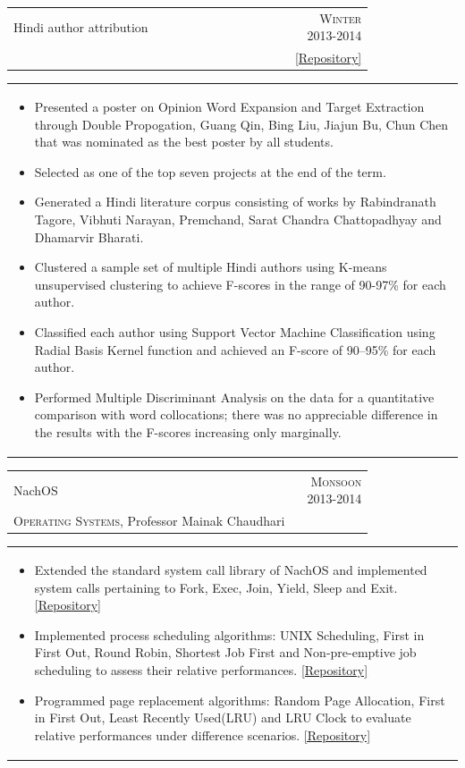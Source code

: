 \documentclass[a4paper,10pt]{article} %
\newcommand{\cproject}[5]{
    \begin{tabular}{p{0.80\linewidth}r}
        \textcolor{NavyBlue}{#2} & \multicolumn{1}{m{4cm}}{\raggedleft \textsc{#1}}\\
        #3 & #4
    \end{tabular}
    \begin{tabular}{p{\linewidth}}
    \vspace{-0.3cm}
        \footnotesize{#5}
    \end{tabular}
    \vspace{-0.5cm}
}
\begin{document}
\cproject
    {Winter 2013-2014}
    {Hindi author attribution}
    {\textsc{\raggedright Artificial Intelligence}, Professor Amitabha Mukherjee}
    { \href{https://github.com/srijanshetty/author-attribution}{ \footnotesize{[Repository]}} }
    {
     \begin{itemize}[leftmargin=0.5cm]
         \item Presented a poster on Opinion Word Expansion and Target Extraction through Double Propogation, Guang Qin,
             Bing Liu, Jiajun Bu, Chun Chen that was nominated as the best poster by all students.
         \item Selected as one of the top seven projects at the end of the term.
         \item Generated a Hindi literature corpus consisting of works by Rabindranath Tagore,
             Vibhuti Narayan, Premchand, Sarat Chandra Chattopadhyay and Dhamarvir Bharati.
         \item Clustered a sample set of multiple Hindi authors using K-means unsupervised clustering to achieve
             F-scores in the range of 90-97\% for each author.
         \item Classified each author using Support Vector Machine Classification using Radial Basis Kernel function
             and achieved an F-score of 90--95\% for each author.
         \item Performed Multiple Discriminant Analysis on the data for a quantitative comparison with word
             collocations; there was no appreciable difference in the results with the F-scores increasing only
             marginally.
     \end{itemize}
    }

\cproject
    {Monsoon 2013-2014}
    {NachOS}
    {\textsc{Operating Systems}, Professor Mainak Chaudhari}
    {}
    {
     \begin{itemize}[leftmargin=0.5cm]
         \item Extended the standard system call library of NachOS and implemented system calls pertaining to Fork, Exec,
             Join, Yield, Sleep and Exit.
             \href{https://github.com/srijanshetty/nachos-syscalls/}{[Repository]}
         \item Implemented process scheduling algorithms: UNIX Scheduling, First in First Out,
             Round Robin, Shortest Job First and Non-pre-emptive job scheduling to assess their relative performances.
             \href{https://github.com/srijanshetty/nachos-scheduling}{[Repository]}
         \item Programmed page replacement algorithms: Random Page Allocation, First in First Out,
             Least Recently Used(LRU) and LRU Clock to evaluate relative performances under difference scenarios.
             \href{https://github.com/srijanshetty/nachos-final/}{[Repository]}
      \end{itemize}
    }
\end{document}
